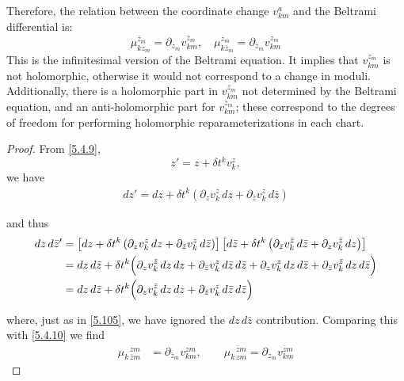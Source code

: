 Therefore, the relation between the coordinate change $v_{k m}^{a}$ and the Beltrami differential is:
\begin{equation}
	\mu_{k z_{m}}^{\bar{z}_{m}}=\partial_{z_{m}} v_{k m}^{\bar{z}_{m}}, \quad \mu_{k \bar{z}_{m}}^{z_{m}}=\partial_{\bar{z}_{m}} v_{k m}^{z_{m}}\label{5.4.11}
\end{equation}
This is the infinitesimal version of the Beltrami equation. It implies that $v_{k m}^{z_{m}}$ is not holomorphic, otherwise it would not correspond to a change in moduli. Additionally, there is a holomorphic part in $v_{k m}^{z_{m}}$ not determined by the Beltrami equation, and an anti-holomorphic part for $v_{k m}^{\bar{z}_{m}}$; these correspond to the degrees of freedom for performing holomorphic reparameterizations in each chart.
\begin{tcolorbox}
	\begin{proof}
		From \eqref{5.4.9},
		\[
		z' = z + \delta t^k v_k^z,
		\]
		we have
		\begin{align}
			dz' = dz + \delta t^k \left( \partial_z v_k^z\, dz + \partial_{\bar z} v_k^z\, d\bar z \right)
		\end{align}
		
		and thus
		\begin{align}
			dz\,d\bar z' 
			&= \left[ dz + \delta t^k \left( \partial_z v_k^z\, dz + \partial_{\bar z} v_k^z\, d\bar z \right) \right]
			\left[ d\bar z + \delta t^k \left( \partial_{\bar z} v_k^{\bar z}\, d\bar z + \partial_z v_k^{\bar z}\, dz \right) \right] \notag \\
			&= dz\,d\bar z 
			+ \delta t^k \Big( \partial_z v_k^{\bar z}\, dz\,dz 
			+ \partial_{\bar z} v_k^z\, d\bar z\,d\bar z 
			+ \partial_z v_k^z\, dz\,d\bar z 
			+ \partial_{\bar z} v_k^{\bar z}\, dz\,d\bar z \Big) \notag \\
			&= dz\,d\bar z 
			+ \delta t^k \Big( \partial_z v_k^{\bar z}\, dz\,dz 
			+ \partial_{\bar z} v_k^z\, d\bar z\,d\bar z \Big)
		\end{align}
		
		where, just as in \eqref{5.105}, we have ignored the $dz\,d\bar z$ contribution. Comparing this with \eqref{5.4.10} we find
		\begin{align}
			\mu_{k\,\bar z m}^{\ \ \ z m} &= \partial_{\bar z_m} v_{k m}^{z m},
			\qquad
			\mu_{k\,z m}^{\ \ \ \bar z m} = \partial_{z_m} v_{k m}^{\bar z m}
		\end{align}
	\end{proof}
\end{tcolorbox}
